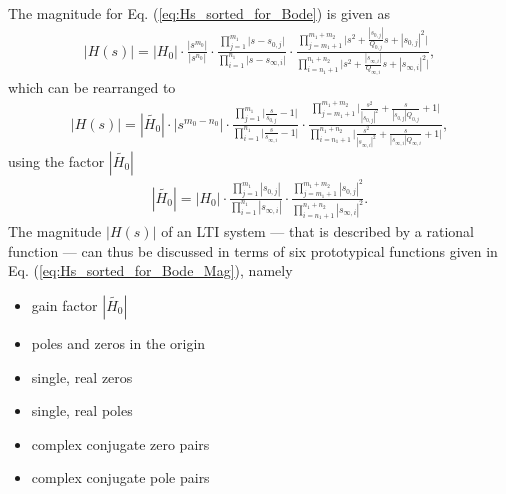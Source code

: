 \documentclass[a4paper,11pt,oneside]{scrartcl}
\newcommand{\eq}[1]{Eq. (\ref{#1})}
\begin{document}
The magnitude for \eq{eq:Hs_sorted_for_Bode} is given as
\begin{align}
|H(s)| = |H_0|
\cdot
\frac
{|s^{m_0}|}
{|s^{n_0}|}
\cdot
\frac
{\prod\limits_{j=1}^{m_1} \bigg|s-s_{0,j}\bigg|}
{\prod\limits_{i=1}^{n_1} \bigg|s-s_{\infty,i}\bigg|}
\cdot
\frac
{\prod\limits_{j=m_1+1}^{m_1+m_2} \bigg|s^2 + \frac{|s_{0,j}|}{Q_{0,j}} s + |s_{0,j}|^2\bigg|}
{\prod\limits_{i=n_1+1}^{n_1+n_2} \bigg|s^2 + \frac{|s_{\infty,i}|}{Q_{\infty,i}} s + |s_{\infty,i}|^2\bigg|},
\end{align}
which can be rearranged to
\begin{align}
\label{eq:Hs_sorted_for_Bode_Mag}
|H(s)| = |\tilde{H_0}|
\cdot
|s^{m_0-n_0}|
\cdot
\frac
{\prod\limits_{j=1}^{m_1} \bigg|\frac{s}{s_{0,j}}-1\bigg|}
{\prod\limits_{i=1}^{n_1} \bigg|\frac{s}{s_{\infty,i}}-1\bigg|}
\cdot
\frac
{\prod\limits_{j=m_1+1}^{m_1+m_2} \bigg|\frac{s^2}{|s_{0,j}|^2} + \frac{s}{|s_{0,j}| Q_{0,j}} + 1\bigg|}
{\prod\limits_{i=n_1+1}^{n_1+n_2} \bigg|\frac{s^2}{|s_{\infty,i}|^2} + \frac{s}{|s_{\infty,i}| Q_{\infty,i}} + 1\bigg|},
\end{align}
using the factor $|\tilde{H_0}|$
\begin{align}
\label{eq:H0tilde}
|\tilde{H_0}| = |{H_0}|
\cdot
\frac
{\prod\limits_{j=1}^{m_1} |s_{0,j}|}
{\prod\limits_{i=1}^{n_1} |s_{\infty,i}|}
\cdot
\frac
{\prod\limits_{j=m_1+1}^{m_1+m_2} |s_{0,j}|^2}
{\prod\limits_{i=n_1+1}^{n_1+n_2} |s_{\infty,i}|^2}.
\end{align}
%
The magnitude $|H(s)|$ of an LTI system --- that is described by a rational function ---
can thus be discussed in terms of six prototypical functions given in
\eq{eq:Hs_sorted_for_Bode_Mag}, namely
\begin{itemize}
\item gain factor $|\tilde{H_0}|$
\item poles and zeros in the origin
\item single, real zeros
\item single, real poles
\item complex conjugate zero pairs
\item complex conjugate pole pairs
\end{itemize}
\end{document}
